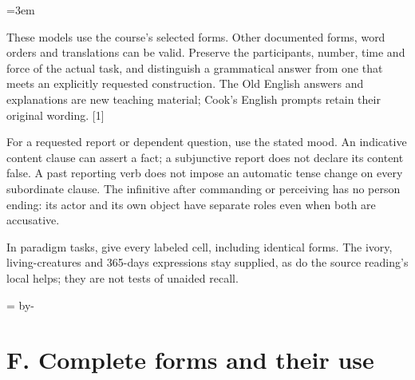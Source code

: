 \newcommand{\runningtitle}{Unit 9. Answer key}

\emergencystretch=3em
\newcommand{\itempara}[2]{\par\addvspace{3pt}\noindent\hangindent=1.8em\hangafter=1\makebox[1.8em][l]{#1.}#2\par}
\newcommand{\reserve}[1]{\par\penalty-100\begingroup\dimen0=\pagegoal\advance\dimen0 by-\pagetotal\ifdim\dimen0<#1\newpage\fi\endgroup}

\raggedright
{}

These models use the course's selected forms. Other documented forms, word orders and translations can be valid. Preserve the participants, number, time and force of the actual task, and distinguish a grammatical answer from one that meets an explicitly requested construction. The Old English answers and explanations are new teaching material; Cook's English prompts retain their original wording. [1]

For a requested report or dependent question, use the stated mood. An indicative content clause can assert a fact; a subjunctive report does not declare its content false. A past reporting verb does not impose an automatic tense change on every subordinate clause. The infinitive after commanding or perceiving has no person ending: its actor and its own object have separate roles even when both are accusative.

In paradigm tasks, give every labeled cell, including identical forms. The ivory, living-creatures and 365-days expressions stay supplied, as do the source reading's local helps; they are not tests of unaided recall.

\reserve{7\baselineskip}
\section*{F. Complete forms and their use}

